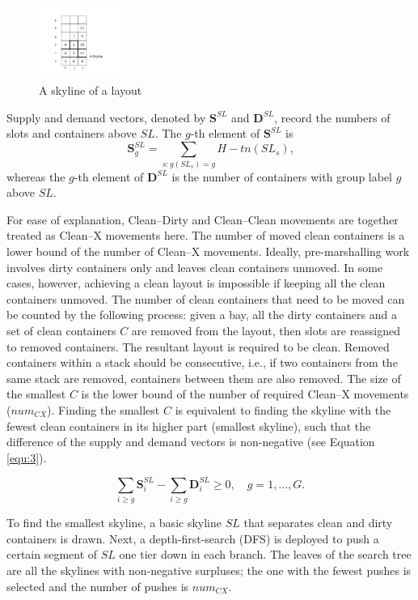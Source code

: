 \documentclass[review,3p,times,authoryear,12pt]{elsarticle}
\begin{document}
\begin{figure}[!htb]
\centering
\includegraphics[width=0.25\textwidth]{fig5.pdf}
\caption{A skyline of a layout}
\label{fig5}
\end{figure}

Supply and demand vectors, denoted by $\mathbf S^\mathit{SL}$ and $\mathbf D^\mathit{SL}$, record the numbers of slots and containers above $\mathit{SL}$.
The $g$-th element of $\mathbf S^\mathit{SL}$ is 
\[
\mathbf S^\mathit{SL}_g=\sum_{s:g(\mathit{SL}_s)=g}H-\mathit{tn}(\mathit{SL}_s)\textrm{,}
\]
whereas the $g$-th element of $\mathbf D^\mathit{SL}$ is the number of containers with group label $g$ above $\mathit{SL}$.

For ease of explanation, Clean--Dirty and Clean--Clean movements are together treated as Clean--X movements here. 
The number of moved clean containers is a lower bound of the number of Clean--X movements. 
Ideally, pre-marshalling work involves dirty containers only and leaves clean containers unmoved. 
In some cases, however, achieving a clean layout is impossible if keeping all the clean containers unmoved. 
The number of clean containers that need to be moved can be counted by the following process: given a bay, all the dirty containers and a set of clean containers $C$ are removed from the layout, then slots are reassigned to removed containers. 
The resultant layout is required to be clean. 
Removed containers within a stack should be consecutive, i.e., if two containers from the same stack are removed, containers between them are also removed. 
The size of the smallest $C$ is the lower bound of the number of required Clean--X movements ($\mathit{num}_{CX}$). 
Finding the smallest $C$ is equivalent to finding the skyline with the fewest clean containers in its higher part (smallest skyline), such that the difference of the supply and demand vectors is non-negative (see Equation \ref{equ:3}).

\begin{equation}
\label{equ:3}
\sum_{i\ge g}\mathbf S^\mathit{SL}_i-\sum_{i\ge g}\mathbf D^\mathit{SL}_i\ge0, \quad g=1,\dots,G\textrm{.}
\end{equation}

To find the smallest skyline, a basic skyline $\mathit{SL}$ that separates clean and dirty containers is drawn. 
Next, a depth-first-search (DFS) is deployed to push a certain segment of $\mathit{SL}$ one tier down in each branch. 
The leaves of the search tree are all the skylines with non-negative surpluses; the one with the fewest pushes is selected and the number of pushes is $\mathit{num}_\mathit{CX}$.
\end{document}
